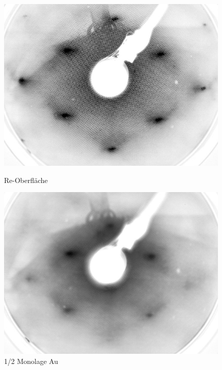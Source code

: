 \begin{figure}[htbp]
	\begin{minipage}[b]{0.5\textwidth} 
		\includegraphics[width=\textwidth]{LEED-Bilder/bearbeitet/unbedampft_E207}
		\caption{Re-Oberfläche}
		\label{Bild} 
	\end{minipage}
	\hfill
	\begin{minipage}[b]{0.5\textwidth}
		\includegraphics[width=\textwidth]{LEED-Bilder/bearbeitet/0_5ML_E208}
		\caption{1/2 Monolage Au}
		\label{Bild} 
	\end{minipage}
	

\end{figure}
